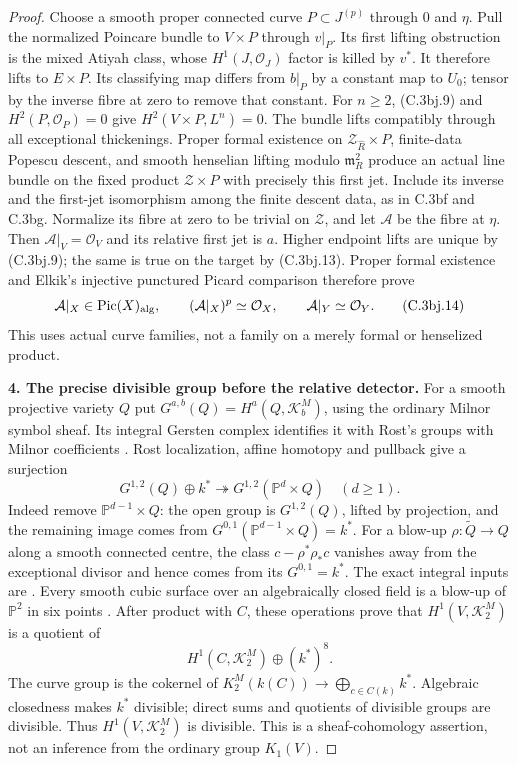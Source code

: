 \begin{proof}
Choose a smooth proper connected curve $P\subset J^{(p)}$ through
$0$ and $\eta$. Pull the normalized Poincare bundle to $V\times P$
through $v|_P$. Its first lifting obstruction is the mixed Atiyah
class, whose $H^1(J,\mathcal O_J)$ factor is killed by $v^*$.
It therefore lifts to $E\times P$. Its classifying map differs from
$b|_P$ by a constant map to $U_0$; tensor by the inverse fibre at zero
to remove that constant. For $n\ge2$, (C.3bj.9) and
$H^2(P,\mathcal O_P)=0$ give $H^2(V\times P,L^n)=0$.
The bundle lifts compatibly through all exceptional thickenings.
Proper formal existence on $\mathcal Z_{\widehat R}\times P$,
finite-data Popescu descent, and smooth henselian lifting modulo
$\mathfrak m_R^2$ produce an actual line bundle on the fixed product
$\mathcal Z\times P$ with precisely this first jet. Include its inverse
and the first-jet isomorphism among the finite descent data, as in
C.3bf and C.3bg. Normalize its fibre at zero to be trivial on
$\mathcal Z$, and let $\mathcal A$ be the fibre at $\eta$.
Then $\mathcal A|_V=\mathcal O_V$ and its relative first jet is $a$.
Higher endpoint lifts are unique by (C.3bj.9); the same is true on
the target by (C.3bj.13). Proper formal existence and Elkik's injective
punctured Picard comparison \citep[unnumbered corollary, p.~573]{D_Elkik1973}
therefore prove
\[
 \mathcal A|_X\in\operatorname{Pic}(X)_{\rm alg},\qquad
 (\mathcal A|_X)^p\simeq\mathcal O_X,\qquad
 \mathcal A|_Y\simeq\mathcal O_Y.
 \tag{C.3bj.14}
\]
This uses actual curve families, not a family on a merely formal or
henselized product.

\textbf{4. The precise divisible group before the relative detector.}
For a smooth projective variety $Q$ put
$G^{a,b}(Q)=H^a(Q,\mathcal K_b^M)$, using the ordinary Milnor
symbol sheaf. Its integral Gersten complex identifies it with Rost's
groups with Milnor coefficients
\citep[Theorems 7.1 and 7.5, author pp.~20--22]{cyKerz2009Milnor}.
Rost localization, affine homotopy and pullback give a surjection
\[
 G^{1,2}(Q)\oplus k^*\twoheadrightarrow
                 G^{1,2}(\mathbb P^d\times Q)\quad(d\ge1).
\]
Indeed remove $\mathbb P^{d-1}\times Q$: the open group is
$G^{1,2}(Q)$, lifted by projection, and the remaining image comes
from $G^{0,1}(\mathbb P^{d-1}\times Q)=k^*$.
For a blow-up $\rho:\widetilde Q\to Q$ along a smooth connected
centre, the class $c-\rho^*\rho_*c$ vanishes away from the exceptional
divisor and hence comes from its $G^{0,1}=k^*$. The exact integral
inputs are \citet[Proposition 4.1(3), Section 5, Corollary 6.5,
Proposition 8.6, and Section 12, pp.~351, 355--360, 370, 382--383]{cyRost1996}.
Every smooth cubic surface over an algebraically closed field is a
blow-up of $\mathbb P^2$ in six points
\citep[Chapter 4, Proposition 2.4, p.~178]{D_HuybrechtsCubics}.
After product with $C$, these operations prove that $H^1(V,\mathcal K_2^M)$
is a quotient of
\[
 H^1(C,\mathcal K_2^M)\oplus(k^*)^8.
\tag{C.3bj.15}
\]
The curve group is the cokernel of
$K_2^M(k(C))\to\bigoplus_{c\in C(k)}k^*$.
Algebraic closedness makes $k^*$ divisible; direct sums and quotients
of divisible groups are divisible. Thus $H^1(V,\mathcal K_2^M)$ is
divisible. This is a sheaf-cohomology assertion, not an inference
from the ordinary group $K_1(V)$.


\end{proof}
